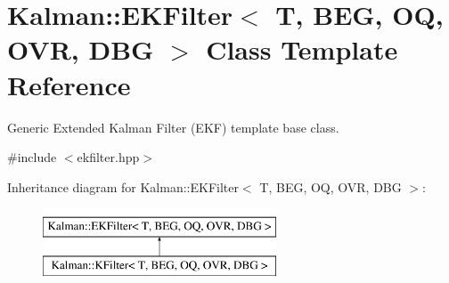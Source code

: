 \hypertarget{classKalman_1_1EKFilter}{}\section{Kalman\+:\+:E\+K\+Filter$<$ T, B\+EG, OQ, O\+VR, D\+BG $>$ Class Template Reference}
\label{classKalman_1_1EKFilter}


Generic Extended Kalman Filter (E\+KF) template base class.  




{\ttfamily \#include $<$ekfilter.\+hpp$>$}

Inheritance diagram for Kalman\+:\+:E\+K\+Filter$<$ T, B\+EG, OQ, O\+VR, D\+BG $>$\+:\begin{figure}[H]
\begin{center}
\leavevmode
\includegraphics[height=2.000000cm]{classKalman_1_1EKFilter}
\end{center}
\end{figure}
